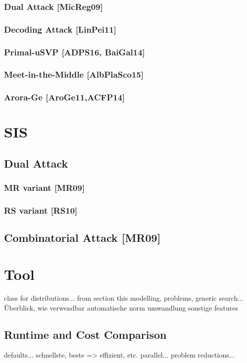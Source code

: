 \documentclass[
  a4paper,  %
  twoside,  %
  bibliography=totoc,
  headsepline,
  cleardoublepage=empty,
  parskip=half,
  draft=false
]{scrbook}
\begin{document}
\subsubsection{Dual Attack [MicReg09]}
\subsubsection{Decoding Attack [LinPei11]}
\subsubsection{Primal-uSVP [ADPS16, BaiGal14]}
\subsubsection{Meet-in-the-Middle [AlbPlaSco15]}
\subsubsection{Arora-Ge [AroGe11,ACFP14]}


\section{SIS}
\subsection{Dual Attack}
\subsubsection{MR variant [MR09]}
\subsubsection{RS variant [RS10]}
\subsection{Combinatorial Attack [MR09]}


\section{Tool}
class for distributions... from section this modelling, problems, generic search... Überblick, wie verwendbar
automatische norm umwandlung
sonstige features

\subsection{Runtime and Cost Comparison}
defaults...
schnellste, beste => effizient, etc. parallel... problem reductions...
\end{document}
